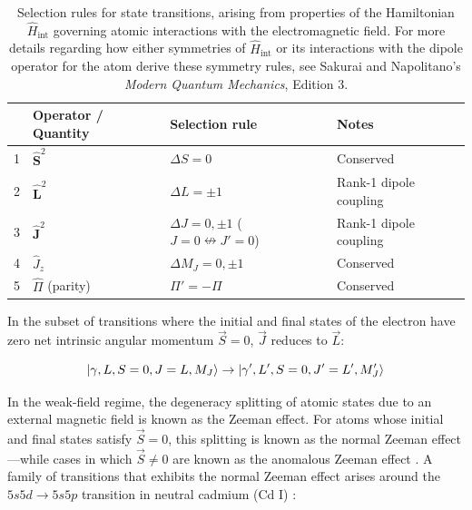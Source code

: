 \documentclass[11pt]{article}
\begin{document}
\begin{table}[H]
\centering
\begin{tabular}{clll}
\hline
\textbf{} & \textbf{Operator / Quantity} & \textbf{Selection rule} & \textbf{Notes} \\
\hline
1 & $\hat{\mathbf{S}}^2$ 
  & $\Delta S = 0$ 
  & Conserved  \\

2 & $\hat{\mathbf{L}}^2$ 
  & $\Delta L = \pm 1$ 
  & Rank-1 dipole coupling \\

3 & $\hat{\mathbf{J}}^2$ 
  & $\Delta J = 0, \pm 1$ \; ($J=0 \nleftrightarrow J'=0$) 
  & Rank-1 dipole coupling \\

4 & $\hat{J}_z$ 
  & $\Delta M_J = 0, \pm 1$ 
  & Conserved \\

5 & $\hat{\Pi}$ (parity) 
  & $\Pi' = -\Pi$ 
  & Conserved  \\
\hline
\end{tabular}
\caption{Selection rules for state transitions, arising from properties of the Hamiltonian $\hat H_{\text{int}}$ governing atomic interactions with the electromagnetic field. For more details regarding how either symmetries of $\hat H_{\text{int}}$ or its interactions with the dipole operator for the atom derive these symmetry rules, see Sakurai and Napolitano's \textit{Modern Quantum Mechanics}, Edition 3\cite{qmech}.}
\label{tab:E1_selection_rules_ops}
\end{table}



In the subset of transitions where the initial and final states of the electron have zero net intrinsic angular momentum $\vec S = 0$, $\vec J$ reduces to $\vec L$:

\begin{equation}
\ket{\gamma, L, S=0, J=L, M_J} \rightarrow \ket{\gamma', L', S=0, J'=L', M_J'}
\label{eq:normal_transition}
\end{equation}

In the weak-field regime, the degeneracy splitting of atomic states due to an external magnetic field is known as the Zeeman effect. For atoms whose initial and final states satisfy $\vec S = 0$, this splitting is known as the normal Zeeman effect---while cases in which $\vec S \neq 0$ are known as the anomalous Zeeman effect \cite{harris}. A family of transitions that exhibits the normal Zeeman effect arises around the $5s5d \rightarrow 5s5p$ transition in neutral cadmium (Cd I) \cite{leybold}:
\end{document}
